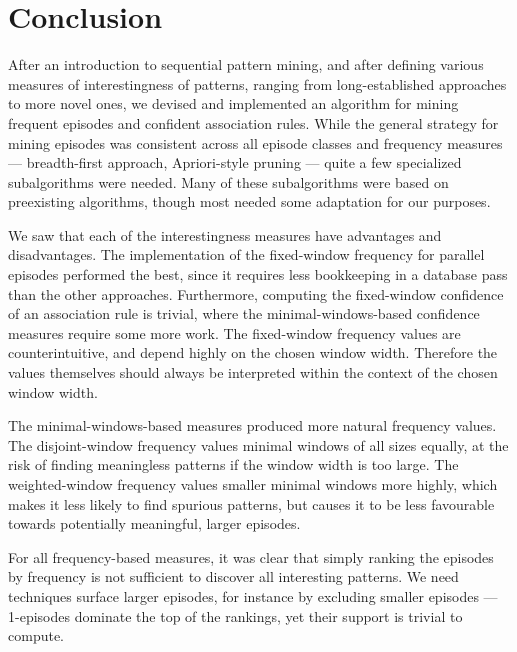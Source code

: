 \chapter{Conclusion}

After an introduction to sequential pattern mining, and after defining various measures of interestingness of patterns, ranging from long-established approaches to more novel ones, we devised and implemented an algorithm for mining frequent episodes and confident association rules. While the general strategy for mining episodes was consistent across all episode classes and frequency measures --- breadth-first approach, Apriori-style pruning --- quite a few specialized subalgorithms were needed. Many of these subalgorithms were based on preexisting algorithms, though most needed some adaptation for our purposes.

We saw that each of the interestingness measures have advantages and disadvantages. The implementation of the fixed-window frequency for parallel episodes performed the best, since it requires less bookkeeping in a database pass than the other approaches. Furthermore, computing the fixed-window confidence of an association rule is trivial, where the minimal-windows-based confidence measures require some more work. The fixed-window frequency values are counterintuitive, and depend highly on the chosen window width. Therefore the values themselves should always be interpreted within the context of the chosen window width.

The minimal-windows-based measures produced more natural frequency values. The disjoint-window frequency values minimal windows of all sizes equally, at the risk of finding meaningless patterns if the window width is too large. The weighted-window frequency values smaller minimal windows more highly, which makes it less likely to find spurious patterns, but causes it to be less favourable towards potentially meaningful, larger episodes.

For all frequency-based measures, it was clear that simply ranking the episodes by frequency is not sufficient to discover all interesting patterns. We need techniques surface larger episodes, for instance by excluding smaller episodes --- 1-episodes dominate the top of the rankings, yet their support is trivial to compute.

